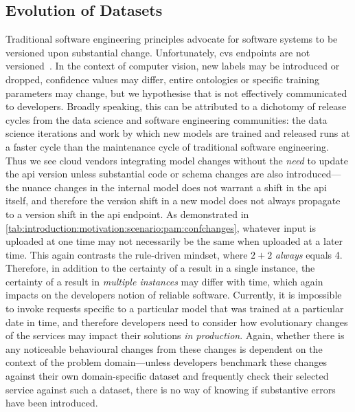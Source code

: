 \subsection{Evolution of Datasets}
Traditional software engineering principles advocate for software systems to be versioned upon substantial change. Unfortunately, \gls{cvs} endpoints are not versioned~\citep{Cummaudo:2019icsme}. In the context of computer vision, new labels may be introduced or dropped, confidence values may differ, entire ontologies or specific training parameters may change, but we hypothesise that is not effectively communicated to developers. Broadly speaking, this can be attributed to a dichotomy of release cycles from the data science and software engineering communities: the data science iterations and work by which new models are trained and released runs at a faster cycle than the maintenance cycle of traditional software engineering. Thus we see cloud vendors integrating model changes without the \textit{need} to update the \gls{api} version unless substantial code or schema changes are also introduced---the nuance changes in the internal model does not warrant a shift in the \gls{api} itself, and therefore the version shift in a new model does not always propagate to a version shift in the \gls{api} endpoint.
As demonstrated in \cref{tab:introduction:motivation:scenario:pam:confchanges}, whatever input is uploaded at one time may not necessarily be the same when uploaded at a later time. This again contrasts the rule-driven mindset, where $2+2$ \textit{always} equals 4. Therefore, in addition to the certainty of a result in a single instance, the certainty of a result in \textit{multiple instances} may differ with time, which again impacts on the developers notion of reliable software.
Currently, it is impossible to invoke requests specific to a particular model that was trained at a particular date in time, and therefore developers need to consider how evolutionary changes of the services may impact their solutions \textit{in production}. Again, whether there is any noticeable behavioural changes from these changes is dependent on the context of the problem domain---unless developers benchmark these changes against their own domain-specific dataset and frequently check their selected service against such a dataset, there is no way of knowing if substantive errors have been introduced.

